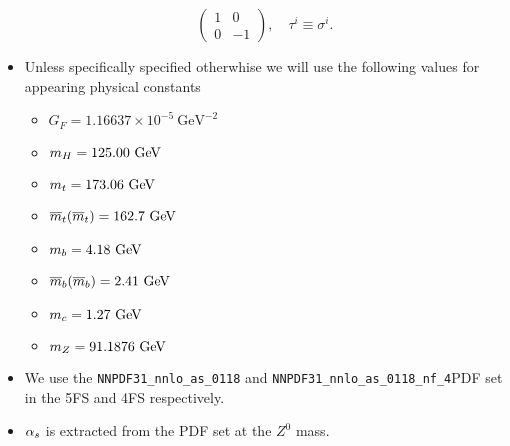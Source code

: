 \begin{itemize}
\begin{equation}
\begin{pmatrix}
                1 & 0 \\
                0 & -1
            \end{pmatrix}, \quad \tau^i \equiv \sigma^i.
        \end{equation}
        \item Unless specifically specified otherwhise we will use the following values for appearing physical constants
        \begin{itemize}
        \item $G_F =  1.16637 \times 10^{-5}\ \text{GeV}^{-2}$
        \item $m_H = 125.00 \ \text{GeV}$
        \item $m_t = 173.06 \ \text{GeV}$
        \item $\msMass{t} = 162.7 \ \GeV$
        \item $m_b = 4.18 \ \text{GeV}$
        \item $\msMass{b} = 2.41 \ \GeV$
        \item $m_c =  1.27\ \text{GeV}$
        \item $m_Z = 91.1876 \ \text{GeV}$
        \end{itemize}
        \item We use the \texttt{NNPDF31\_nnlo\_as\_0118} and \texttt{NNPDF31\_nnlo\_as\_0118\_nf\_4}\acs{PDF} set in the 5\acs{FS} and 4\acs{FS} respectively.
        \item $\alpha_s$ is extracted from the \acs{PDF} set at the $Z^0$ mass.
    \end{itemize}


\endgroup

